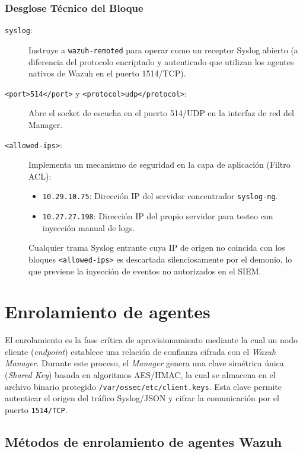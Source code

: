 \subsubsection{Desglose Técnico del Bloque \texttt{}}

\begin{description}
\item[\texttt{syslog}:] Instruye a \texttt{wazuh-remoted} para operar como un receptor Syslog abierto (a diferencia del protocolo encriptado y autenticado que utilizan los agentes nativos de Wazuh en el puerto 1514/TCP).
\item[\texttt{<port>514</port>} y \texttt{<protocol>udp</protocol>}:] Abre el socket de escucha en el puerto 514/UDP en la interfaz de red del Manager.
\item[\texttt{<allowed-ips>}:] Implementa un mecanismo de seguridad en la capa de aplicación (Filtro ACL):
\begin{itemize}
    \item \texttt{10.29.10.75}: Dirección IP del servidor concentrador \texttt{syslog-ng}.
    \item \texttt{10.27.27.198}: Dirección IP del propio servidor para testeo con inyección manual de logs.
\end{itemize}
Cualquier trama Syslog entrante cuya IP de origen no coincida con los bloques \texttt{<allowed-ips>} es descartada silenciosamente por el demonio, lo que previene la inyección de eventos no autorizados en el SIEM.
\end{description}



\section{Enrolamiento de agentes}

El enrolamiento es la fase crítica de aprovisionamiento mediante la cual un nodo cliente (\textit{endpoint}) establece una relación de confianza cifrada con el \textit{Wazuh Manager}. Durante este proceso, el \textit{Manager} genera una clave simétrica única (\textit{Shared Key}) basada en algoritmos AES/HMAC, la cual se almacena en el archivo binario protegido \texttt{/var/ossec/etc/client.keys}. Esta clave permite autenticar el origen del tráfico Syslog/JSON y cifrar la comunicación por el puerto \texttt{1514/TCP}.

\subsection{Métodos de enrolamiento de agentes Wazuh}

